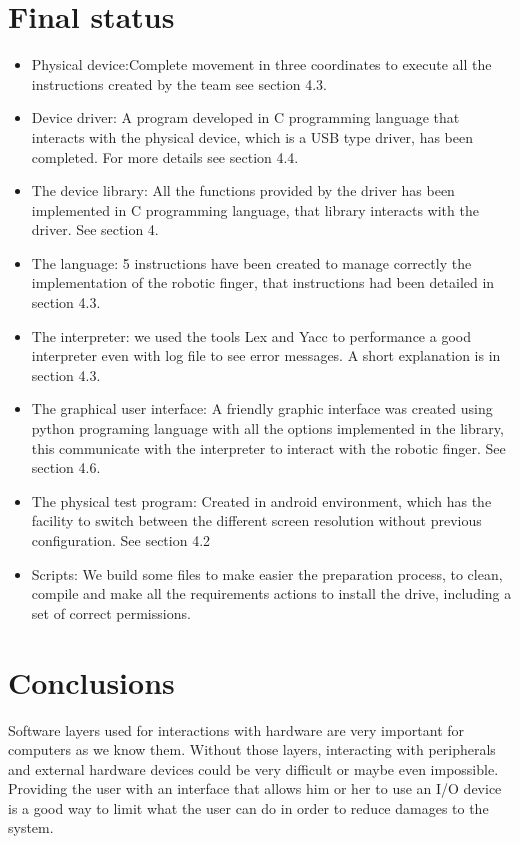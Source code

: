 \documentclass[12pt]{article}
\begin{document}
\section{Final status}
\begin{itemize}
\item Physical device:Complete movement in three coordinates to execute all the instructions created by the team see section 4.3.
\item Device driver: A program developed in C programming language that interacts with the physical device, which is a USB type driver, has been completed. For more details see section 4.4.
\item The device library: All the functions provided by the driver has been implemented in C programming language, that library interacts with the driver. See section 4.
\item The language: 5 instructions have been created to manage correctly the implementation of the robotic finger, that instructions had been detailed in section 4.3.
\item The interpreter: we used the tools Lex and Yacc to performance a good interpreter even with log file to see error messages. A short explanation is in section 4.3.
\item The graphical user interface: A friendly graphic interface was created using python programing language with all the options implemented in the library, this communicate with the interpreter to interact with the robotic finger. See section 4.6.
\item The physical test program: Created in android environment, which has the facility to switch between the different screen resolution without previous configuration. See section 4.2
\item Scripts: We build some files to make easier the preparation process, to clean, compile and make all the requirements actions to install the drive, including a set of correct permissions.
\end{itemize}

\section{Conclusions}
Software layers used for interactions with hardware are very important for computers as we know them. Without those layers, interacting with peripherals and external hardware devices could be very difficult or maybe even impossible. Providing the user with an interface that allows him or her to use an I/O device is a good way to limit what the user can do in order to reduce damages to the system.
\end{document}
